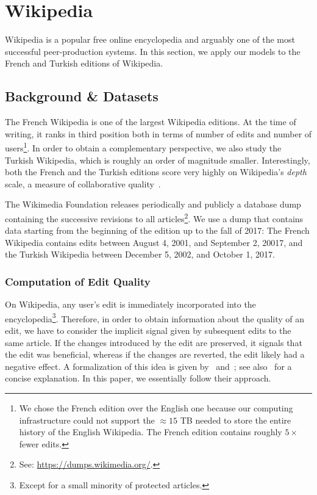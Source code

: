 \section{Wikipedia}
\label{pps:sec:wikipedia}

Wikipedia is a popular free online encyclopedia and arguably one of the most successful peer-production systems.
In this section, we apply our models to the French and Turkish editions of Wikipedia.

\subsection{Background \& Datasets}

The French Wikipedia is one of the largest Wikipedia editions.
At the time of writing, it ranks in third position both in terms of number of edits and number of users\footnote{%
	We chose the French edition over the English one because our computing infrastructure could not support the $\approx15$ TB needed to store the entire history of the English Wikipedia.
	The French edition contains roughly $5\times$ fewer edits.
}.
In order to obtain a complementary perspective, we also study the Turkish Wikipedia, which is roughly an order of magnitude smaller.
Interestingly, both the French and the Turkish editions score very highly on Wikipedia's \emph{depth} scale, a measure of collaborative quality~\citep{wikimedia2017depth}.

The Wikimedia Foundation releases periodically and publicly a database dump containing the successive revisions to all articles\footnote{%
	See: \url{https://dumps.wikimedia.org/}.}.
We use a dump that contains data starting from the beginning of the edition up to the fall of 2017:
The French Wikipedia contains edits between August 4, 2001, and September 2, 20017, and the Turkish Wikipedia between December 5, 2002, and October 1, 2017.

\subsubsection{Computation of Edit Quality}

On Wikipedia, any user's edit is immediately incorporated into the encyclopedia\footnote{Except for a small minority of protected articles.}.
Therefore, in order to obtain information about the quality of an edit, we have to consider the implicit signal given by subsequent edits to the same article.
If the changes introduced by the edit are preserved, it signals that the edit was beneficial, whereas if the changes are reverted, the edit likely had a negative effect.
A formalization of this idea is given by~\citet{adler2007content} and~\citet{druck2008learning};
see also~\citet{dealfaro2013content} for a concise explanation.
In this paper, we essentially follow their approach.

